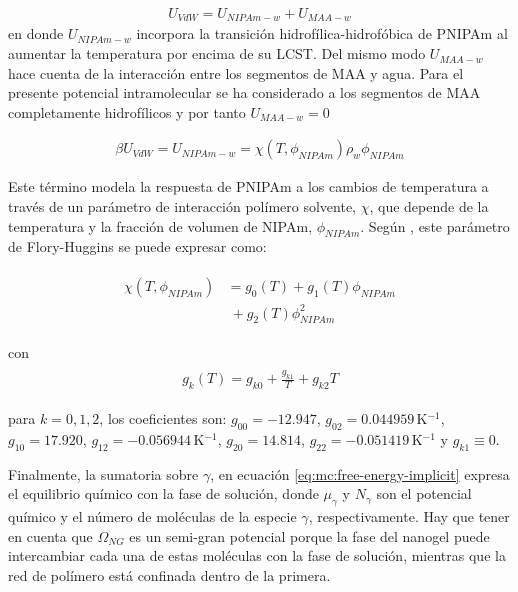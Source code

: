 	\begin{align}
		U_{VdW} = U_{NIPAm-w} + U_{MAA-w}
	\end{align}
	\noindent en donde $U_{NIPAm-w}$ incorpora la transici\'on hidrof\'ilica-hidrof\'obica de PNIPAm al aumentar la temperatura por encima de su LCST. 
	Del mismo modo $U_{MAA-w}$ hace cuenta de la interacci\'on entre los segmentos de MAA y agua.
	Para el presente potencial intramolecular se ha considerado a los segmentos de MAA completamente hidrof\'ilicos y por tanto $U_{MAA-w} = 0$
	
	\begin{align}
		\beta U_{VdW} = U_{NIPAm-w} = \chi (T, \phi_{NIPAm})\rho_w \phi_{NIPAm}
	\end{align}
	
	
	Este  t\'ermino modela la respuesta de PNIPAm a los cambios de temperatura a trav\'es de un par\'ametro de interacci\'on pol\'imero solvente, $\chi$, que depende de la temperatura y la fracci\'on de volumen de NIPAm, $\phi_{NIPAm}$.
	Seg\'un  \citet{afroze2000}, este par\'ametro de Flory-Huggins se puede expresar como:
	
	
	\begin{align}
		\begin{aligned}
			\chi (T, \phi_{NIPAm}) &=g_0(T) +g_1(T)\phi_{NIPAm} \\
			&~+ g_2(T)\phi_{NIPAm}^2
		\end{aligned}
	\end{align}
	
	\noindent con
	\begin{align}
		\begin{aligned} 
			g_k(T)=g_{k0} + \frac{g_{k1}}{T} + g_{k2}T
		\end{aligned}
	\end{align}
	
	
	\noindent para  $k=0,1,2$, los coeficientes son: $g_{00}= -12.947$, $g_{02}=0.044959\,$K$^{-1}$, $g_{10}= 17.920$, $g_{12}= -0.056944$\,K$^{-1}$, $g_{20}= 14.814$, $g_{22}= -0.051419$\,K$^{-1}$  y $g_{k1}\equiv 0$. \cite{afroze2000}
	
	
	
	
	Finalmente, la sumatoria sobre $\gamma$, en ecuaci\'on \ref{eq:mc:free-energy-implicit} expresa el equilibrio qu\'imico con la fase de soluci\'on, donde $\mu_\gamma$ y $N_\gamma$ son el potencial qu\'imico y el n\'umero de mol\'eculas de la especie $\gamma$, respectivamente.
	Hay que tener en cuenta que $\Omega_{NG}$ es un semi-gran potencial porque la fase del nanogel puede intercambiar cada una de estas mol\'eculas con la fase de soluci\'on, mientras que la red de pol\'imero est\'a confinada dentro de la primera.
	
